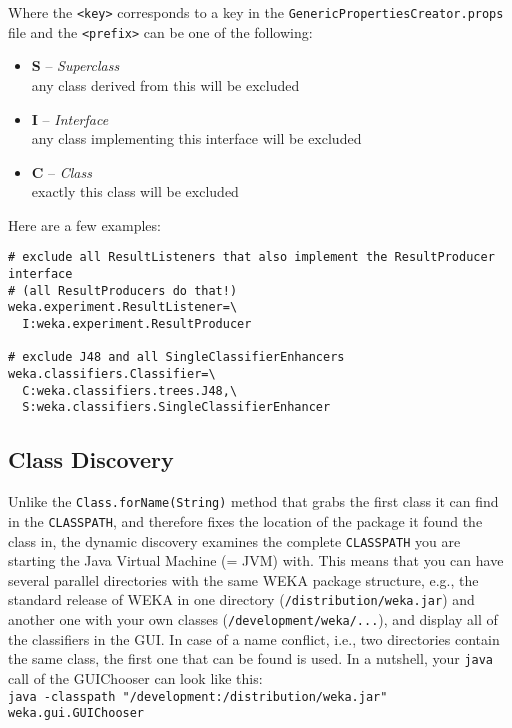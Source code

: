 \noindent Where the \verb=<key>= corresponds to a key in the
\verb=GenericPropertiesCreator.props= file and the \verb=<prefix>= can
be one of the following:

\begin{itemize}
\item \textbf{S} -- \textit{Superclass}\\
  any class derived from this will be excluded
\item \textbf{I} -- \textit{Interface}\\
  any class implementing this interface will be excluded
\item \textbf{C} -- \textit{Class}\\
  exactly this class will be excluded
\end{itemize}

\noindent Here are a few examples:

\begin{verbatim}
# exclude all ResultListeners that also implement the ResultProducer interface
# (all ResultProducers do that!)
weka.experiment.ResultListener=\
  I:weka.experiment.ResultProducer

# exclude J48 and all SingleClassifierEnhancers
weka.classifiers.Classifier=\
  C:weka.classifiers.trees.J48,\
  S:weka.classifiers.SingleClassifierEnhancer
\end{verbatim}

\subsection{Class Discovery}
Unlike the \verb=Class.forName(String)= method that grabs the first class it
can find in the \verb=CLASSPATH=, and therefore fixes the location of the
package it found the class in, the dynamic discovery examines the
complete \verb=CLASSPATH= you are starting the Java Virtual Machine (= JVM)
with. This means that you can have several parallel directories with
the same WEKA package structure, e.g., the standard release of WEKA in
one directory (\verb=/distribution/weka.jar=) and another one with your own
classes (\verb=/development/weka/...=), and display all of the classifiers in
the GUI. In case of a name conflict, i.e., two directories contain the
same class, the first one that can be found is used. In a nutshell,
your \texttt{java} call of the GUIChooser can look like this:\\

\verb=java -classpath "/development:/distribution/weka.jar" weka.gui.GUIChooser=\\

